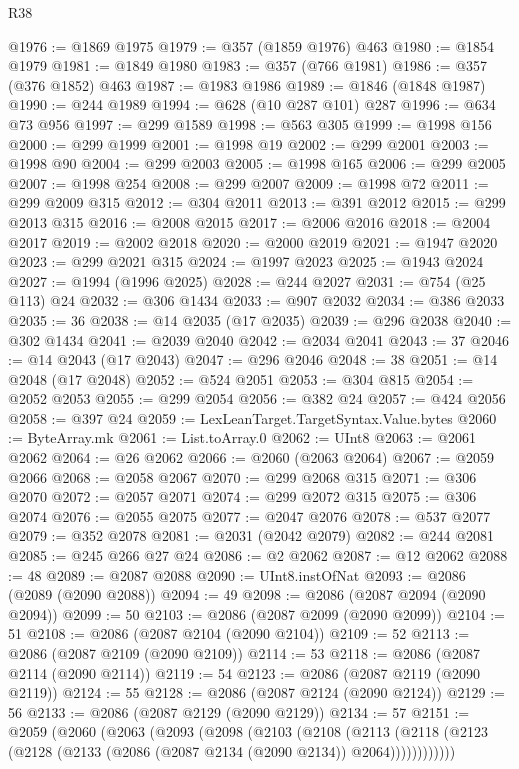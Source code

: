 \begin{lexlean}{R38}
\begin{coremodule}
@1976 := @1869 @1975
@1979 := @357 (@1859 @1976) @463
@1980 := @1854 @1979
@1981 := @1849 @1980
@1983 := @357 (@766 @1981)
@1986 := @357 (@376 @1852) @463
@1987 := @1983 @1986
@1989 := @1846 (@1848 @1987)
@1990 := @244 @1989
@1994 := @628 (@10 @287 @101) @287
@1996 := @634 @73 @956
@1997 := @299 @1589
@1998 := @563 @305
@1999 := @1998 @156
@2000 := @299 @1999
@2001 := @1998 @19
@2002 := @299 @2001
@2003 := @1998 @90
@2004 := @299 @2003
@2005 := @1998 @165
@2006 := @299 @2005
@2007 := @1998 @254
@2008 := @299 @2007
@2009 := @1998 @72
@2011 := @299 @2009 @315
@2012 := @304 @2011
@2013 := @391 @2012
@2015 := @299 @2013 @315
@2016 := @2008 @2015
@2017 := @2006 @2016
@2018 := @2004 @2017
@2019 := @2002 @2018
@2020 := @2000 @2019
@2021 := @1947 @2020
@2023 := @299 @2021 @315
@2024 := @1997 @2023
@2025 := @1943 @2024
@2027 := @1994 (@1996 @2025)
@2028 := @244 @2027
@2031 := @754 (@25 @113) @24
@2032 := @306 @1434
@2033 := @907 @2032
@2034 := @386 @2033
@2035 := 36
@2038 := @14 @2035 (@17 @2035)
@2039 := @296 @2038
@2040 := @302 @1434
@2041 := @2039 @2040
@2042 := @2034 @2041
@2043 := 37
@2046 := @14 @2043 (@17 @2043)
@2047 := @296 @2046
@2048 := 38
@2051 := @14 @2048 (@17 @2048)
@2052 := @524 @2051
@2053 := @304 @815
@2054 := @2052 @2053
@2055 := @299 @2054
@2056 := @382 @24
@2057 := @424 @2056
@2058 := @397 @24
@2059 := LexLeanTarget.TargetSyntax.Value.bytes
@2060 := ByteArray.mk
@2061 := List.toArray.{0}
@2062 := UInt8
@2063 := @2061 @2062
@2064 := @26 @2062
@2066 := @2060 (@2063 @2064)
@2067 := @2059 @2066
@2068 := @2058 @2067
@2070 := @299 @2068 @315
@2071 := @306 @2070
@2072 := @2057 @2071
@2074 := @299 @2072 @315
@2075 := @306 @2074
@2076 := @2055 @2075
@2077 := @2047 @2076
@2078 := @537 @2077
@2079 := @352 @2078
@2081 := @2031 (@2042 @2079)
@2082 := @244 @2081
@2085 := @245 @266 @27 @24
@2086 := @2 @2062
@2087 := @12 @2062
@2088 := 48
@2089 := @2087 @2088
@2090 := UInt8.instOfNat
@2093 := @2086 (@2089 (@2090 @2088))
@2094 := 49
@2098 := @2086 (@2087 @2094 (@2090 @2094))
@2099 := 50
@2103 := @2086 (@2087 @2099 (@2090 @2099))
@2104 := 51
@2108 := @2086 (@2087 @2104 (@2090 @2104))
@2109 := 52
@2113 := @2086 (@2087 @2109 (@2090 @2109))
@2114 := 53
@2118 := @2086 (@2087 @2114 (@2090 @2114))
@2119 := 54
@2123 := @2086 (@2087 @2119 (@2090 @2119))
@2124 := 55
@2128 := @2086 (@2087 @2124 (@2090 @2124))
@2129 := 56
@2133 := @2086 (@2087 @2129 (@2090 @2129))
@2134 := 57
@2151 := @2059
    (@2060
      (@2063
        (@2093
          (@2098
            (@2103
              (@2108
                (@2113
                  (@2118 (@2123 (@2128 (@2133 (@2086 (@2087 @2134 (@2090 @2134)) @2064))))))))))))

\end{coremodule}
\end{lexlean}

